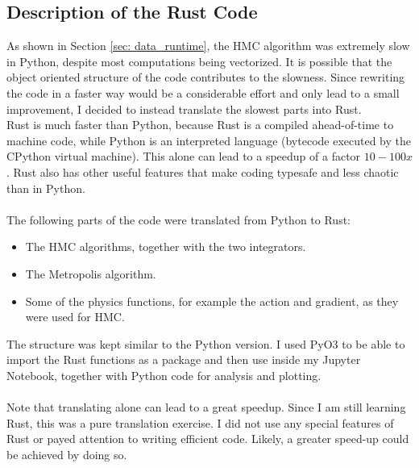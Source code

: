 \subsection{Description of the Rust Code}
As shown in Section \ref{sec: data_runtime}, the HMC algorithm was extremely slow in Python, despite most computations being vectorized. It is possible that the object oriented structure of the code contributes to the slowness. Since rewriting the code in a faster way would be a considerable effort and only lead to a small improvement, I decided to instead translate the slowest parts into Rust. \\
Rust is much faster than Python, because Rust is a compiled ahead-of-time to machine code, while Python is an interpreted language (bytecode executed by the CPython virtual machine). This alone can lead to a speedup of a factor $10-100x$. Rust also has other useful features that make coding typesafe and less chaotic than in Python. \cite{rust_cookbook}\\\\
The following parts of the code were translated from Python to Rust: 
\begin{itemize}
    \item The HMC algorithms, together with the two integrators. 
    \item The Metropolis algorithm. 
    \item Some of the physics functions, for example the action and gradient, as they were used for HMC.
\end{itemize}
The structure was kept similar to the Python version. I used PyO3 to be able to import the Rust functions as a package and then use inside my Jupyter Notebook, together with Python code for analysis and plotting. \cite{pyo3}\\\\
Note that translating alone can lead to a great speedup. Since I am still learning Rust, this was a pure translation exercise. I did not use any special features of Rust or payed attention to writing efficient code. Likely, a greater speed-up could be achieved by doing so. 
